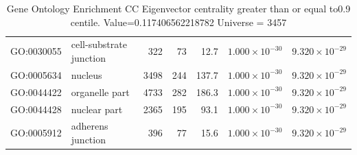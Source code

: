 \begin{table}[ht]
\begin{tabular}{llrrrrr}
  GO:0030055 & cell-substrate junction & 322 & 73 & 12.7 & $1.000 \times 10^{-30}$ & $9.320 \times 10^{-29}$ \\ 
  GO:0005634 & nucleus & 3498 & 244 & 137.7 & $1.000 \times 10^{-30}$ & $9.320 \times 10^{-29}$ \\ 
  GO:0044422 & organelle part & 4733 & 282 & 186.3 & $1.000 \times 10^{-30}$ & $9.320 \times 10^{-29}$ \\ 
  GO:0044428 & nuclear part & 2365 & 195 & 93.1 & $1.000 \times 10^{-30}$ & $9.320 \times 10^{-29}$ \\ 
  GO:0005912 & adherens junction & 396 & 77 & 15.6 & $1.000 \times 10^{-30}$ & $9.320 \times 10^{-29}$ \\ 
   \hline
\end{tabular}
\caption{Gene Ontology Enrichment CC Eigenvector centrality  greater than or equal to0.9 centile.   Value=0.117406562218782 Universe = 3457} 
\label{tab:Gene Ontology Enrichment CC Eigenvector centrality  greater than or equal to0.9 centile.   Value=0.117406562218782 Universe = 3457}
\end{table}


